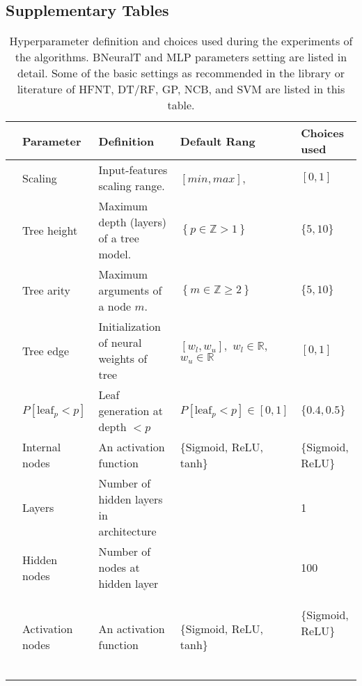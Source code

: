 \documentclass[11pt,a4paper]{article}
\begin{document}
\newpage
    \subsection{Supplementary Tables}
    \label{sec:results_table_other}
    \begin{table}[H]
        \centering
        \footnotesize 		
        \caption{Hyperparameter definition and choices used during the experiments of the algorithms. BNeuralT and MLP parameters setting are listed in detail. Some of the  basic settings as recommended in the library or literature of HFNT, DT/RF, GP, NCB, and SVM are listed in this table.}
        \label{tab:parameters}
        \renewcommand{\arraystretch}{1.2}
        \setlength{\tabcolsep}{0.1cm}
        \begin{tabular}{llp{6cm}p{3.5cm}l}
            \toprule
            & Parameter & Definition & Default Rang &  Choices used \\
            \midrule
            \parbox[t]{3mm}{}
            & Scaling & Input-features scaling range. & $[min,max]$, & $[0,1]$ \\	
            & Tree height & Maximum depth (layers) of a tree model. & $ \left\lbrace p \in  \mathbb{Z} > 1 \right\rbrace $  & $\{5,10\}$ \\			
            & Tree arity  & Maximum arguments of a node $ m $. & $ \left\lbrace m \in  \mathbb{Z} \ge 2 \right\rbrace $  & $\{5,10\}$ \\			
            & Tree edge  & Initialization of neural weights of tree & $[w_l,w_u],$ $ w_l\in \mathbb{R}$,  $w_u \in \mathbb{R}$  & $[0,1]$ \\			
            & $P[\text{leaf}_p <p]$ & Leaf generation at depth $< p$ & $P[\text{leaf}_p <p] \in [0,1]$ & $\{0.4, 0.5\}$\\
            & Internal nodes  & An activation function & \parbox[t]{3.5cm}{\raggedright \{Sigmoid, ReLU, tanh\} } &\parbox[t]{2.5cm}{\raggedright \{Sigmoid, ReLU\} }\\
            \parbox[t]{3mm}{}	
            & Layers  & Number of hidden layers in  architecture &  & 1\\
            & Hidden nodes  & Number of nodes at hidden layer &  & 100\\
            & Activation nodes  & An activation function & \parbox[t]{3.5cm}{\raggedright \{Sigmoid, ReLU, tanh\}}& \parbox[t]{2.5cm}{\raggedright \{Sigmoid, ReLU\} }\ \\

\end{tabular}
\end{table}
\end{document}

